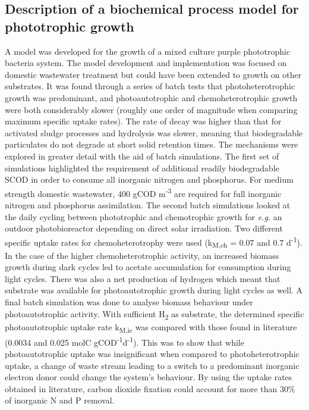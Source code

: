 \subsection{Description of a biochemical process model for phototrophic growth}

A model was developed for the growth of a mixed culture purple phototrophic bacteria system. The model development and implementation was focused on domestic wastewater treatment but could have been extended to growth on other substrates. It was found through a series of batch tests that photoheterotrophic growth was predominant, and photoautotrophic and chemoheterotrophic growth were both considerably slower (roughly one order of magnitude when comparing maximum specific uptake rates).  The rate of decay was higher than that for activated sludge processes and hydrolysis was slower, meaning that biodegradable particulates do not degrade at short solid retention times. 
\skippingparagraph
The mechanisms were explored in greater detail with the aid of batch simulations. The first set of simulations highlighted the requirement of additional readily biodegradable SCOD in order to consume all inorganic nitrogen and phosphorus. For medium strength domestic wastewater, 400 gCOD m\textsuperscript{-3} are required for full inorganic nitrogen and phosphorus assimilation. The second batch simulations looked at the daily cycling between phototrophic and chemotrophic growth for \textit{e.g.} an outdoor photobioreactor depending on direct solar irradiation. Two different specific uptake rates for chemoheterotrophy were used (k\textsubscript{M,ch} = 0.07 and 0.7 d\textsuperscript{-1}). In the case of the higher chemoheterotrophic activity, an increased biomass growth during dark cycles led to acetate accumulation for consumption during light cycles. There was also a net production of hydrogen which meant that substrate was available for photoautotrophic growth during light cycles as well. A final batch simulation was done to analyse biomass behaviour under photoautotrophic activity. With sufficient H\textsubscript{2} as substrate, the determined specific photoautotrophic uptake rate k\textsubscript{M,ic} was compared with those found in literature (\num{0.0034} and \num{0.025} molC gCOD\textsuperscript{-1}d\textsuperscript{-1}). This was to show that while photoautotrophic uptake was insignificant when compared to photoheterotrophic uptake, a change of waste stream leading to a switch to a predominant inorganic electron donor could change the system's behaviour. By using the uptake rates obtained in literature, carbon dioxide fixation could account for more than 30\% of inorganic N and P removal.
